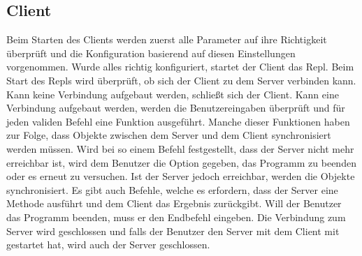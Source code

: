 \subsection{Client}
Beim Starten des Clients werden zuerst alle Parameter auf ihre Richtigkeit überprüft und die Konfiguration basierend auf diesen Einstellungen vorgenommen. Wurde alles richtig konfiguriert, startet der Client das Repl. Beim Start des Repls wird überprüft, ob sich der Client zu dem Server verbinden kann. Kann keine Verbindung aufgebaut werden, schließt sich der Client. Kann eine Verbindung aufgebaut werden, werden die Benutzereingaben überprüft und für jeden validen Befehl eine Funktion ausgeführt. Manche dieser Funktionen haben zur Folge, dass Objekte zwischen dem Server und dem Client synchronisiert werden müssen. Wird bei so einem Befehl festgestellt, dass der Server nicht mehr erreichbar ist, wird dem Benutzer die Option gegeben, das Programm zu beenden oder es erneut zu versuchen. Ist der Server jedoch erreichbar, werden die Objekte synchronisiert. Es gibt auch Befehle, welche es erfordern, dass der Server eine Methode ausführt und dem Client das Ergebnis zurückgibt. Will der Benutzer das Programm beenden, muss er den Endbefehl eingeben. Die Verbindung zum Server wird geschlossen und falls der Benutzer den Server mit dem Client mit gestartet hat, wird auch der Server geschlossen.

